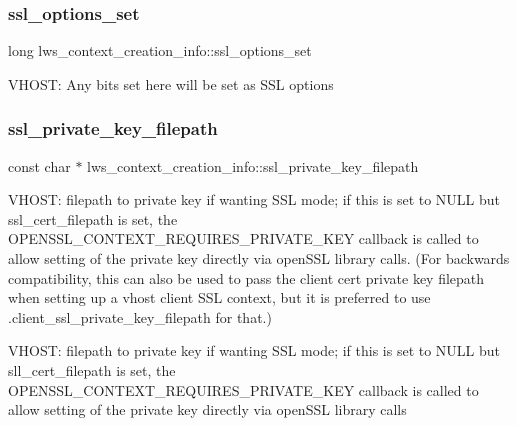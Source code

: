 \subsubsection{\texorpdfstring{ssl\+\_\+options\+\_\+set}{ssl\_options\_set}}
{\footnotesize\ttfamily long lws\+\_\+context\+\_\+creation\+\_\+info\+::ssl\+\_\+options\+\_\+set}

V\+H\+O\+ST\+: Any bits set here will be set as S\+SL options \mbox{\label{structlws__context__creation__info_a2e3413d0c73946f35c162d4a56ba7d09}} 
\subsubsection{\texorpdfstring{ssl\+\_\+private\+\_\+key\+\_\+filepath}{ssl\_private\_key\_filepath}}
{\footnotesize\ttfamily const char $\ast$ lws\+\_\+context\+\_\+creation\+\_\+info\+::ssl\+\_\+private\+\_\+key\+\_\+filepath}

V\+H\+O\+ST\+: filepath to private key if wanting S\+SL mode; if this is set to N\+U\+LL but ssl\+\_\+cert\+\_\+filepath is set, the O\+P\+E\+N\+S\+S\+L\+\_\+\+C\+O\+N\+T\+E\+X\+T\+\_\+\+R\+E\+Q\+U\+I\+R\+E\+S\+\_\+\+P\+R\+I\+V\+A\+T\+E\+\_\+\+K\+EY callback is called to allow setting of the private key directly via open\+S\+SL library calls. (For backwards compatibility, this can also be used to pass the client cert private key filepath when setting up a vhost client S\+SL context, but it is preferred to use .client\+\_\+ssl\+\_\+private\+\_\+key\+\_\+filepath for that.)

V\+H\+O\+ST\+: filepath to private key if wanting S\+SL mode; if this is set to N\+U\+LL but sll\+\_\+cert\+\_\+filepath is set, the O\+P\+E\+N\+S\+S\+L\+\_\+\+C\+O\+N\+T\+E\+X\+T\+\_\+\+R\+E\+Q\+U\+I\+R\+E\+S\+\_\+\+P\+R\+I\+V\+A\+T\+E\+\_\+\+K\+EY callback is called to allow setting of the private key directly via open\+S\+SL library calls \mbox{\label{structlws__context__creation__info_ae534add81f6d3086310cfeb2d2a1f266}} 
